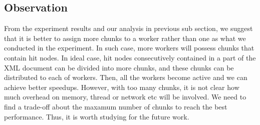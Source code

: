  
\subsection{Observation}

From the experiment results and our analysis in previous sub section, we suggest
that it is better to assign more chunks to a worker rather than one as what we
conducted in the experiment. In such case, more workers will possess chunks that
contain hit nodes. In ideal case, hit nodes consecutively contained in a part of
the XML document can be divided into more chunks, and these chunks can be
distributed to each of workers.  Then, all the workers become active and we can
achieve better speedups. However, with too many chunks, it is not clear how
much overhead on memory, thread or network etc will be involved. We need to find
a trade-off about the maxamum number of chunks to reach the best performance.
Thus, it is worth studying for the future work.




 